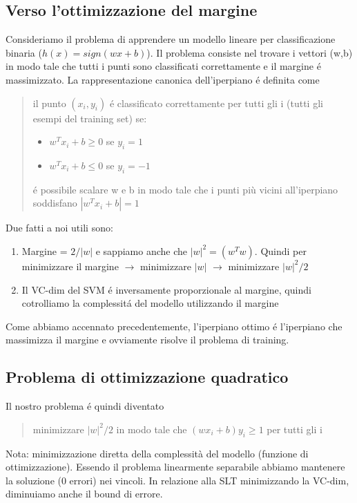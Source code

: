 \documentclass{article}
\begin{document}
\subsection{Verso l'ottimizzazione del margine}
Consideriamo il problema di apprendere un modello lineare per classificazione binaria \newline ($h(x)=sign(wx+b)$). Il problema consiste nel trovare i vettori (w,b) in modo tale che tutti i punti sono classificati correttamente e il margine é massimizzato. \newline
La rappresentazione canonica dell'iperpiano é definita come 
\begin{quote}
    il punto $(x_i,y_i)$ é classificato correttamente per tutti gli i (tutti gli esempi del training set) se:
    \begin{itemize}
        \item $w^Tx_i+b \geq 0$ se $y_i=1$
        \item $w^Tx_i+b \leq 0$ se $y_i=-1$
    \end{itemize}
    é possibile scalare w e b in modo tale che i punti più vicini all'iperpiano soddisfano $|w^Tx_i+b|=1$
\end{quote}
Due fatti a noi utili sono:
\begin{enumerate}
    \item Margine = $2/|w|$ e sappiamo anche che $|w|^2=(w^Tw)$. Quindi per minimizzare il margine $\rightarrow$ minimizzare $|w|$ $\rightarrow$ minimizzare $|w|^2/2$
    \item Il VC-dim del SVM é inversamente proporzionale al margine, quindi cotrolliamo la complessitá del modello utilizzando il margine
\end{enumerate}
Come abbiamo accennato precedentemente, l'iperpiano ottimo é l'iperpiano che massimizza il margine e ovviamente risolve il problema di training. 

\subsection{Problema di ottimizzazione quadratico}
Il nostro problema é quindi diventato 
\begin{quote}
    minimizzare $|w|^2/2$ in modo tale che $(wx_i+b)y_i\geq1$ per tutti gli i
\end{quote}
Nota: minimizzazione diretta della complessità del modello (funzione di ottimizzazione). Essendo il problema linearmente separabile abbiamo mantenere la soluzione (0 errori) nei vincoli. In relazione alla SLT minimizzando la VC-dim, diminuiamo anche il bound di errore.
\end{document}
